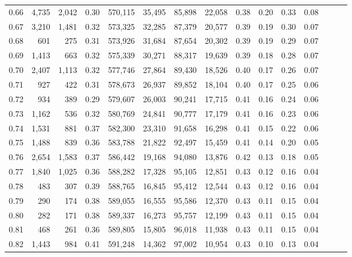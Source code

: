 \begin{tabular}{rrrrrrrrrrrrrrr}
0.66 &   4,735 &  2,042 &  0.30 &  570,115 &   35,495 &   85,898 &   22,058 &  0.38 &  0.20 &  0.33 &      0.08 \\
0.67 &   3,210 &  1,481 &  0.32 &  573,325 &   32,285 &   87,379 &   20,577 &  0.39 &  0.19 &  0.30 &      0.07 \\
0.68 &     601 &    275 &  0.31 &  573,926 &   31,684 &   87,654 &   20,302 &  0.39 &  0.19 &  0.29 &      0.07 \\
0.69 &   1,413 &    663 &  0.32 &  575,339 &   30,271 &   88,317 &   19,639 &  0.39 &  0.18 &  0.28 &      0.07 \\
0.70 &   2,407 &  1,113 &  0.32 &  577,746 &   27,864 &   89,430 &   18,526 &  0.40 &  0.17 &  0.26 &      0.07 \\
0.71 &     927 &    422 &  0.31 &  578,673 &   26,937 &   89,852 &   18,104 &  0.40 &  0.17 &  0.25 &      0.06 \\
0.72 &     934 &    389 &  0.29 &  579,607 &   26,003 &   90,241 &   17,715 &  0.41 &  0.16 &  0.24 &      0.06 \\
0.73 &   1,162 &    536 &  0.32 &  580,769 &   24,841 &   90,777 &   17,179 &  0.41 &  0.16 &  0.23 &      0.06 \\
0.74 &   1,531 &    881 &  0.37 &  582,300 &   23,310 &   91,658 &   16,298 &  0.41 &  0.15 &  0.22 &      0.06 \\
0.75 &   1,488 &    839 &  0.36 &  583,788 &   21,822 &   92,497 &   15,459 &  0.41 &  0.14 &  0.20 &      0.05 \\
0.76 &   2,654 &  1,583 &  0.37 &  586,442 &   19,168 &   94,080 &   13,876 &  0.42 &  0.13 &  0.18 &      0.05 \\
0.77 &   1,840 &  1,025 &  0.36 &  588,282 &   17,328 &   95,105 &   12,851 &  0.43 &  0.12 &  0.16 &      0.04 \\
0.78 &     483 &    307 &  0.39 &  588,765 &   16,845 &   95,412 &   12,544 &  0.43 &  0.12 &  0.16 &      0.04 \\
0.79 &     290 &    174 &  0.38 &  589,055 &   16,555 &   95,586 &   12,370 &  0.43 &  0.11 &  0.15 &      0.04 \\
0.80 &     282 &    171 &  0.38 &  589,337 &   16,273 &   95,757 &   12,199 &  0.43 &  0.11 &  0.15 &      0.04 \\
0.81 &     468 &    261 &  0.36 &  589,805 &   15,805 &   96,018 &   11,938 &  0.43 &  0.11 &  0.15 &      0.04 \\
0.82 &   1,443 &    984 &  0.41 &  591,248 &   14,362 &   97,002 &   10,954 &  0.43 &  0.10 &  0.13 &      0.04 \\

\end{tabular}
